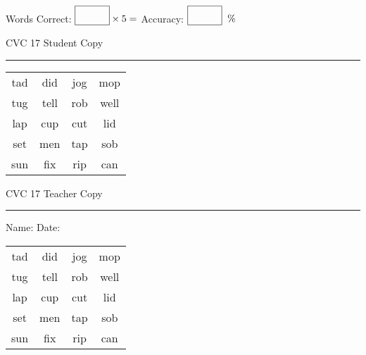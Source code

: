 \documentclass{memoir}
\begin{document}
\small

Words Correct: $\fbox{\phantom{\huge 100}} \times 5 = $ Accuracy: $\fbox{\phantom{\huge 100}}\;\; \%$ 

\vfill

\newpage


\footnotesize \noindent
CVC 17 \hfill Student Copy
\smallskip
\hrule

\Large

\setlength{\tabcolsep}{14pt}
\def\arraystretch{2}

{\selectfont


\begin{vplace}[0.5]
\begin{center}
\begin{tabular}{cccc}
tad & did & jog & mop \\
tug & tell & rob & well \\
lap & cup & cut & lid \\
set & men & tap & sob \\
sun & fix & rip & can \\
\end{tabular}
\end{center}
\end{vplace}

}

\newpage

\footnotesize \noindent
CVC 17 \hfill Teacher Copy
\smallskip
\hrule

\small

\vfill

\noindent
Name: \underline{\hspace{1.75in}} \hfill Date: \underline{\hspace{1in}}

\Large

{\selectfont


\begin{vplace}[0.5]
\begin{center}
\begin{tabular}{cccc}
tad & did & jog & mop \\
tug & tell & rob & well \\
lap & cup & cut & lid \\
set & men & tap & sob \\
sun & fix & rip & can \\
\end{tabular}
\end{center}
\end{vplace}



}
\end{document}
